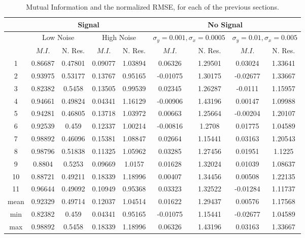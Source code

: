 \begin{table}[t]
\centering
\begin{tabular}{|c | c | c | c | c | c | c | c | c |}
\hline
& \multicolumn{4}{|c|}{Signal} & \multicolumn{4}{|c|}{No Signal}\\
\hline
& \multicolumn{2}{|c|}{Low Noise} & \multicolumn{2}{|c|}{High Noise}
& \multicolumn{2}{|c|}{$\sigma_y = 0.001, \sigma_x = 0.0005$}
& \multicolumn{2}{|c|}{$\sigma_y = 0.01, \sigma_x = 0.005$}\\
\hline
& $M.I.$ & N. Res. &
  $M.I.$ & N. Res. &
  $M.I.$ & N. Res. &
  $M.I.$ & N. Res. \\
\hline
\hline
1 &   0.86687  &0.47801 &  0.09077  &1.03894 &  0.06326  &  1.29501 & 0.03024  &1.33641 \\
2 &   0.93975  &0.53177 &  0.13767  &0.95165 &  -0.01075  & 1.30175 & -0.02677 &1.33667 \\
3 &   0.82382  &0.5458  &  0.13505  &0.99539 &  0.02345  &  1.26287 & -0.0111  &1.15957 \\
4 &   0.94661  &0.49824 &  0.04341  &1.16129 &  -0.00906  & 1.43196 & 0.00147  &1.09988 \\
5 &   0.94281  &0.46805 &  0.13718  &1.03972 &  0.00663  &  1.25664 & -0.00204 &1.20107 \\
6 &   0.92539  &0.459   &  0.12337  &1.00214 &  -0.00816  & 1.2708 &  0.01775  &1.04589 \\
7 &   0.98892  &0.46096 &  0.15381  &1.08847 &  0.02664  &  1.15441 & 0.03163  &1.20543 \\
8 &   0.98796  &0.51838 &  0.11325  &1.05962 &  0.03285  &  1.27456 & 0.01951  &1.1225 \\
9 &   0.8804   &0.5253  &  0.09669  &1.0157  &  0.01628  &  1.32024 & 0.01039  &1.08637 \\
10 &  0.88721   &0.49211 & 0.18339  &1.18996 &  0.00407  &  1.34456 & 0.00508  &1.22135 \\
11 &  0.96644   &0.49092 & 0.10949  &0.95368 &  0.03323  &  1.32522 & -0.01284 &1.11737 \\
\hline
mean &0.92329  &0.49714 & 0.12037   &1.04514 &  0.01622  &  1.29437 & 0.00576  &1.17568 \\
\hline
min &  0.82382  &0.459   &  0.04341  &0.95165 & -0.01075  & 1.15441 & -0.02677 &1.04589 \\
\hline
max &  0.98892  &0.5458  & 0.18339   &1.18996 & 0.06326  &  1.43196 & 0.03163  &1.33667 \\
\hline
\end{tabular}
\caption{Mutual Information and the normalized \ac{RMSE}, for each of the previous
sections.}
\label{tab:SingleVoxelActivationComparison}
\end{table}


